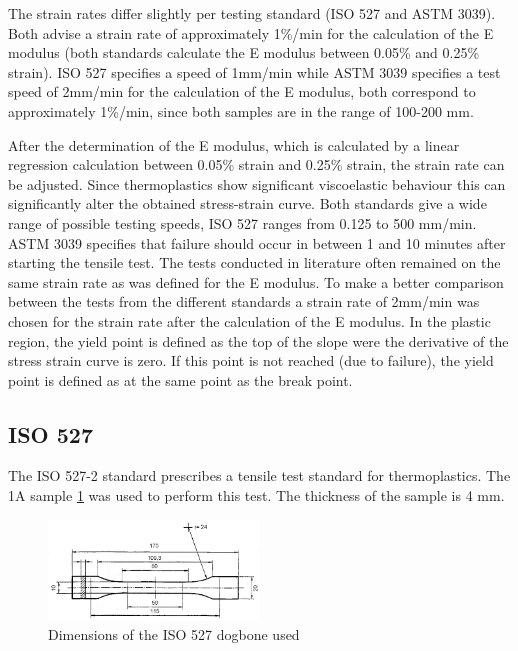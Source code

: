 The strain rates differ slightly per testing standard (ISO 527 and ASTM 3039). Both advise a strain rate of approximately 1\%/min for the calculation of the E modulus (both standards  calculate the E modulus between 0.05\% and 0.25\% strain).  ISO 527 specifies a speed of 1mm/min while ASTM 3039 specifies a test speed of 2mm/min for the calculation of the E modulus, both correspond to approximately 1\%/min, since both samples are in the range of 100-200 mm.

After the determination of the E modulus, which is calculated by a linear regression calculation between 0.05\% strain and 0.25\% strain, the strain rate can be adjusted. Since thermoplastics show significant viscoelastic behaviour this can significantly alter the obtained stress-strain curve. Both standards give a wide range of possible testing speeds, ISO 527 ranges from 0.125 to 500 mm/min. ASTM 3039 specifies that failure should occur in between 1 and 10 minutes after starting the tensile test. The tests conducted in literature often remained on the same strain rate as was defined for the E modulus. To make a better comparison between the tests from the different standards a strain rate of 2mm/min was chosen for the strain rate after the calculation of the E modulus.
In the plastic region, the yield point is defined as the top of the slope were the derivative of the stress strain curve is zero. If this point is not reached (due to failure), the yield point is defined as at the same point as the break point.

\subsection{ISO 527}
The ISO 527-2 standard \cite{Afd2016NEN-EN-ISO527-2} prescribes a tensile test standard for thermoplastics. The 1A sample \ref{fig:ISO527} was used to perform this test. The thickness of the sample is 4 mm.
\begin{figure}[H]
    \centering
    \includegraphics[width=0.50\textwidth]{chapter_5_Experimentaltesting/figures/ISO527specimen.png}
    \caption{Dimensions of the ISO 527 dogbone used}
    \label{fig:ISO527}
\end{figure}
